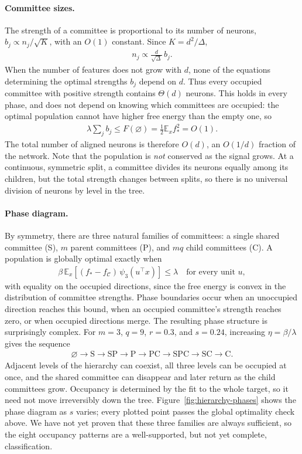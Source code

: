 \documentclass[midterm]{sparreport}
\theoremstyle{definition}
\newcommand{\E}{\mathbb{E}}
\newcommand{\comm}{\mathcal{C}}
\begin{document}
\paragraph{Committee sizes.}
The strength of a committee is proportional to its number of neurons, $b_j \propto n_j/\sqrt{K}$, with an $O(1)$ constant.
Since $K = d^2/\Delta$,
\begin{align*}
    n_j \propto \frac{d}{\sqrt{\Delta}}\, b_j.
\end{align*}
When the number of features does not grow with $d$, none of the equations determining the optimal strengths $b_j$ depend on $d$.
Thus every occupied committee with positive strength contains $\Theta(d)$ neurons.
This holds in every phase, and does not depend on knowing which committees are occupied: the optimal population cannot have higher free energy than the empty one, so
\begin{align*}
    \lambda\sum_j b_j \leq F(\varnothing) = \frac{1}{2}\E_x f_*^2 = O(1).
\end{align*}
The total number of aligned neurons is therefore $O(d)$, an $O(1/d)$ fraction of the network.
Note that the population is \emph{not} conserved as the signal grows.
At a continuous, symmetric split, a committee divides its neurons equally among its children, but the total strength changes between splits, so there is no universal division of neurons by level in the tree.

\paragraph{Phase diagram.}
By symmetry, there are three natural families of committees: a single shared committee (S), $m$ parent committees (P), and $mq$ child committees (C).
A population is globally optimal exactly when
\begin{align*}
    \beta\,\E_x\!\left[(f_* - f_\comm)\,\psi_3(u^\top x)\right] \leq \lambda
    \quad \text{for every unit } u,
\end{align*}
with equality on the occupied directions, since the free energy is convex in the distribution of committee strengths.
Phase boundaries occur when an unoccupied direction reaches this bound, when an occupied committee's strength reaches zero, or when occupied directions merge.
The resulting phase structure is surprisingly complex.
For $m=3$, $q=9$, $r=0.3$, and $s=0.24$, increasing $\eta = \beta/\lambda$ gives the sequence
\begin{align*}
    \varnothing
    \to \mathrm{S}
    \to \mathrm{SP}
    \to \mathrm{P}
    \to \mathrm{PC}
    \to \mathrm{SPC}
    \to \mathrm{SC}
    \to \mathrm{C}.
\end{align*}
Adjacent levels of the hierarchy can coexist, all three levels can be occupied at once, and the shared committee can disappear and later return as the child committees grow.
Occupancy is determined by the fit to the whole target, so it need not move irreversibly down the tree.
Figure~\ref{fig:hierarchy-phases} shows the phase diagram as $s$ varies; every plotted point passes the global optimality check above.
We have not yet proven that these three families are always sufficient, so the eight occupancy patterns are a well-supported, but not yet complete, classification.
\end{document}
